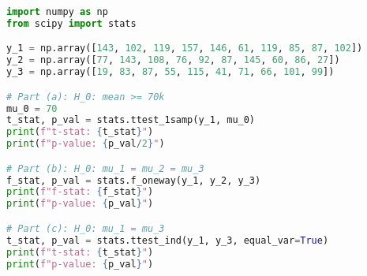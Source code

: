 \documentclass{article}
\begin{document}
\begin{lstlisting}[language=Python, caption=Code for Question 1 \emph{Hypothesis
Testing}]
import numpy as np
from scipy import stats

y_1 = np.array([143, 102, 119, 157, 146, 61, 119, 85, 87, 102])
y_2 = np.array([77, 143, 108, 76, 92, 87, 145, 60, 86, 27])
y_3 = np.array([19, 83, 87, 55, 115, 41, 71, 66, 101, 99])

# Part (a): H_0: mean >= 70k
mu_0 = 70
t_stat, p_val = stats.ttest_1samp(y_1, mu_0)
print(f"t-stat: {t_stat}")
print(f"p-value: {p_val/2}")

# Part (b): H_0: mu_1 = mu_2 = mu_3
f_stat, p_val = stats.f_oneway(y_1, y_2, y_3)
print(f"f-stat: {f_stat}")
print(f"p-value: {p_val}")

# Part (c): H_0: mu_1 = mu_3
t_stat, p_val = stats.ttest_ind(y_1, y_3, equal_var=True)
print(f"t-stat: {t_stat}")
print(f"p-value: {p_val}")
\end{lstlisting}

\pagebreak
\end{document}
